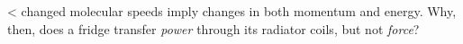 <%
changed molecular speeds imply changes in both momentum and
energy. Why, then, does a fridge transfer \emph{power}
through its radiator coils, but not \emph{force}?
